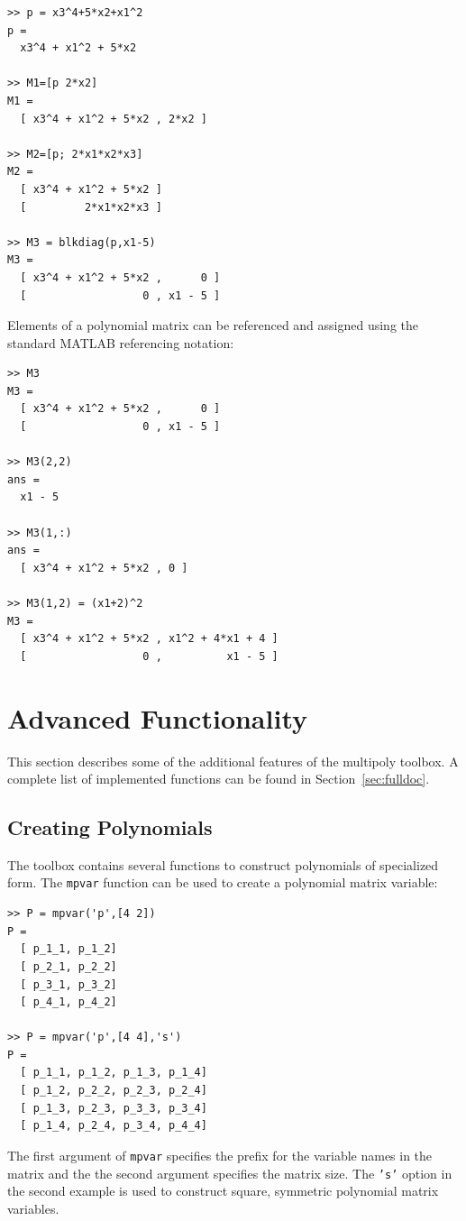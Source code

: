 \documentclass{article}
\begin{document}
\begin{verbatim}
>> p = x3^4+5*x2+x1^2
p =
  x3^4 + x1^2 + 5*x2

>> M1=[p 2*x2]
M1 =
  [ x3^4 + x1^2 + 5*x2 , 2*x2 ]

>> M2=[p; 2*x1*x2*x3]
M2 =
  [ x3^4 + x1^2 + 5*x2 ]
  [         2*x1*x2*x3 ]

>> M3 = blkdiag(p,x1-5)
M3 =
  [ x3^4 + x1^2 + 5*x2 ,      0 ]
  [                  0 , x1 - 5 ]
\end{verbatim}
Elements of a polynomial matrix can be referenced and assigned using
the standard MATLAB referencing notation:

\begin{verbatim}
>> M3
M3 =
  [ x3^4 + x1^2 + 5*x2 ,      0 ]
  [                  0 , x1 - 5 ]

>> M3(2,2)
ans =
  x1 - 5

>> M3(1,:)
ans =
  [ x3^4 + x1^2 + 5*x2 , 0 ]

>> M3(1,2) = (x1+2)^2
M3 =
  [ x3^4 + x1^2 + 5*x2 , x1^2 + 4*x1 + 4 ]
  [                  0 ,          x1 - 5 ]
\end{verbatim}


\section{Advanced Functionality}
\label{sec:advanced}

This section describes some of the additional features of the
multipoly toolbox.  A complete list of implemented functions
can be found in Section~\ref{sec:fulldoc}.

\subsection{Creating Polynomials}


The toolbox contains several functions to construct polynomials of
specialized form. The \texttt{mpvar} function can be used to create a
polynomial matrix variable:

\begin{verbatim}
>> P = mpvar('p',[4 2])
P =
  [ p_1_1, p_1_2]
  [ p_2_1, p_2_2]
  [ p_3_1, p_3_2]
  [ p_4_1, p_4_2]

>> P = mpvar('p',[4 4],'s')
P =
  [ p_1_1, p_1_2, p_1_3, p_1_4]
  [ p_1_2, p_2_2, p_2_3, p_2_4]
  [ p_1_3, p_2_3, p_3_3, p_3_4]
  [ p_1_4, p_2_4, p_3_4, p_4_4]
\end{verbatim}
The first argument of \texttt{mpvar} specifies the prefix for the
variable names in the matrix and the the second argument specifies the
matrix size. The \texttt{'s'} option in the second example is used to
construct square, symmetric polynomial matrix variables.
\end{document}
